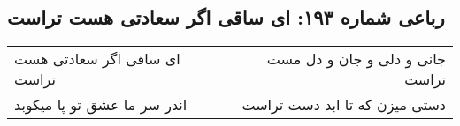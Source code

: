 \begin{center}
\section*{رباعی شماره ۱۹۳: ای ساقی اگر سعادتی هست تراست}
\label{sec:0193}
\begin{longtable}{l p{0.5cm} r}
ای ساقی اگر سعادتی هست تراست
&&
جانی و دلی و جان و دل مست تراست
\\
اندر سر ما عشق تو پا میکوبد
&&
دستی میزن که تا ابد دست تراست
\\
\end{longtable}
\end{center}
